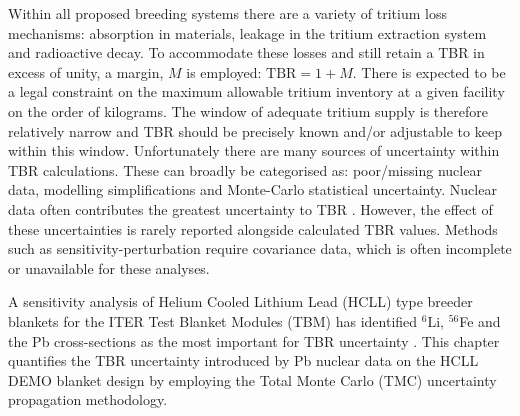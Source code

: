 Within all proposed breeding systems there are a variety of tritium loss mechanisms: absorption in materials, leakage in the tritium extraction system and radioactive decay. To accommodate these losses and still retain a TBR in excess of unity, a margin, $M$ is employed: $\mathrm{TBR} = 1 + M$. There is expected to be a legal constraint on the maximum allowable tritium inventory at a given facility on the order of kilograms. The window of adequate tritium supply is therefore relatively narrow and TBR should be precisely known and/or adjustable to keep within this window. Unfortunately there are many sources of uncertainty within TBR calculations. These can broadly be categorised as: poor/missing nuclear data, modelling simplifications and Monte-Carlo statistical uncertainty. Nuclear data often contributes the greatest uncertainty to TBR \cite{El-Guebaly2009}. However, the effect of these uncertainties is rarely reported alongside calculated TBR values. Methods such as sensitivity-perturbation require covariance data, which is often incomplete or unavailable for these analyses.


A sensitivity analysis of Helium Cooled Lithium Lead (HCLL)  type breeder blankets for the ITER Test Blanket Modules (TBM)  has identified $^{6}$Li, $^{56}$Fe and the Pb cross-sections as the most important for TBR uncertainty \cite{Leichtle2011}. This chapter quantifies the TBR uncertainty introduced by Pb nuclear data on the HCLL DEMO blanket design by employing the Total Monte Carlo (TMC) uncertainty propagation methodology.




